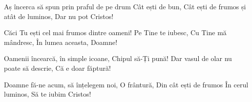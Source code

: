 
\beginverse
Aș încerca să spun prin praful de pe drum
Cât ești de bun,
Cât ești de frumos și atât de luminos,
Dar nu pot Cristos!
\endverse

\beginchorus
Căci Tu ești cel mai frumos dintre oameni!
Pe Tine te iubesc,
Cu Tine mă mândresc,
În lumea aceasta, Doamne!
\endchorus

\beginverse
Oamenii încearcă, în simple icoane,
Chipul să-Ți pună!
Dar vasul de olar nu poate să descrie,
Că e doar făptură!
\endverse

\beginverse
Doamne fă-ne acum, să înțelegem noi,
O frântură,
Din cât ești de frumos
În cerul luminos,
Să te iubim Cristos!
\endverse

\endsong